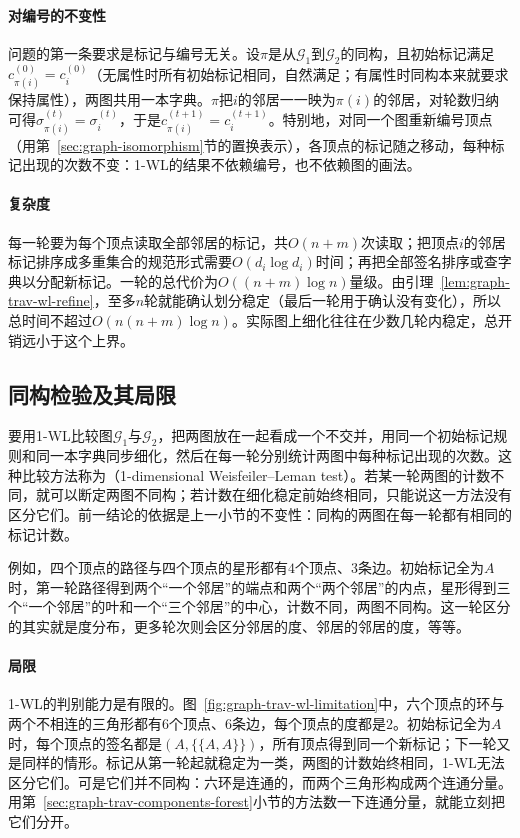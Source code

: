 \paragraph{对编号的不变性}
问题的第一条要求是标记与编号无关。设$\pi$是从$\mathcal G_1$到$\mathcal G_2$的同构，且初始标记满足$c_{\pi(i)}^{(0)}=c_i^{(0)}$（无属性时所有初始标记相同，自然满足；有属性时同构本来就要求保持属性），两图共用一本字典。$\pi$把$i$的邻居一一映为$\pi(i)$的邻居，对轮数归纳可得$\sigma_{\pi(i)}^{(t)}=\sigma_i^{(t)}$，于是$c_{\pi(i)}^{(t+1)}=c_i^{(t+1)}$。特别地，对同一个图重新编号顶点（用第~\ref{sec:graph-isomorphism}节的置换表示），各顶点的标记随之移动，每种标记出现的次数不变：1-WL的结果不依赖编号，也不依赖图的画法。

\paragraph{复杂度}
每一轮要为每个顶点读取全部邻居的标记，共$O(n+m)$次读取；把顶点$i$的邻居标记排序成多重集合的规范形式需要$O(d_i\log d_i)$时间；再把全部签名排序或查字典以分配新标记。一轮的总代价为$O((n+m)\log n)$量级。由引理~\ref{lem:graph-trav-wl-refine}，至多$n$轮就能确认划分稳定（最后一轮用于确认没有变化），所以总时间不超过$O(n(n+m)\log n)$。实际图上细化往往在少数几轮内稳定，总开销远小于这个上界。

\subsection{同构检验及其局限}
\label{sec:graph-trav-wl-power}

要用1-WL比较图$\mathcal G_1$与$\mathcal G_2$，把两图放在一起看成一个不交并，用同一个初始标记规则和同一本字典同步细化，然后在每一轮分别统计两图中每种标记出现的次数。这种比较方法称为（1-dimensional Weisfeiler--Leman test）。若某一轮两图的计数不同，就可以断定两图不同构；若计数在细化稳定前始终相同，只能说这一方法没有区分它们。前一结论的依据是上一小节的不变性：同构的两图在每一轮都有相同的标记计数。

例如，四个顶点的路径与四个顶点的星形都有$4$个顶点、$3$条边。初始标记全为$A$时，第一轮路径得到两个“一个邻居”的端点和两个“两个邻居”的内点，星形得到三个“一个邻居”的叶和一个“三个邻居”的中心，计数不同，两图不同构。这一轮区分的其实就是度分布，更多轮次则会区分邻居的度、邻居的邻居的度，等等。

\paragraph{局限}
1-WL的判别能力是有限的。图~\ref{fig:graph-trav-wl-limitation}中，六个顶点的环与两个不相连的三角形都有$6$个顶点、$6$条边，每个顶点的度都是$2$。初始标记全为$A$时，每个顶点的签名都是$(A,\{\!\{A,A\}\!\})$，所有顶点得到同一个新标记；下一轮又是同样的情形。标记从第一轮起就稳定为一类，两图的计数始终相同，1-WL无法区分它们。可是它们并不同构：六环是连通的，而两个三角形构成两个连通分量。用第~\ref{sec:graph-trav-components-forest}小节的方法数一下连通分量，就能立刻把它们分开。

